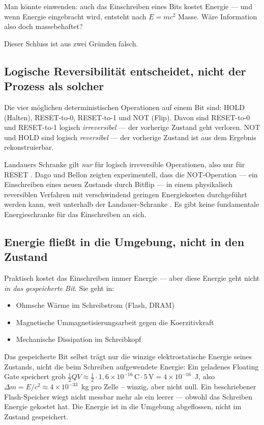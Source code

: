 Man könnte einwenden: auch das Einschreiben eines Bits kostet Energie —
und wenn Energie eingebracht wird, entsteht nach $E = mc^2$ Masse. Wäre
Information also doch massebehaftet?

Dieser Schluss ist aus zwei Gründen falsch.

\subsection{Logische Reversibilität entscheidet, nicht der Prozess als solcher}

Die vier möglichen deterministischen Operationen auf einem Bit sind:
HOLD (Halten), RESET-to-0, RESET-to-1 und NOT (Flip). Davon sind
RESET-to-0 und RESET-to-1 logisch \emph{irreversibel} — der vorherige
Zustand geht verloren. NOT und HOLD sind logisch \emph{reversibel} —
der vorherige Zustand ist aus dem Ergebnis rekonstruierbar.

Landauers Schranke gilt \emph{nur} für logisch irreversible Operationen,
also nur für RESET \cite{Landauer1961}. Dago und Bellon zeigten
experimentell, dass die NOT-Operation — ein Einschreiben eines neuen
Zustands durch Bitflip — in einem physikalisch reversiblen Verfahren
mit verschwindend geringen Energiekosten durchgeführt werden kann, weit
unterhalb der Landauer-Schranke \cite{Dago2023}. Es gibt keine
fundamentale Energieschranke für das Einschreiben an sich.

\subsection{Energie fließt in die Umgebung, nicht in den Zustand}

Praktisch kostet das Einschreiben immer Energie — aber diese Energie
geht nicht \emph{in das gespeicherte Bit}. Sie geht in:

\begin{itemize}
  \item Ohmsche Wärme im Schreibstrom (Flash, DRAM)
  \item Magnetische Ummagnetisierungsarbeit gegen die Koerzitivkraft
  \item Mechanische Dissipation im Schreibkopf
\end{itemize}

Das gespeicherte Bit selbst trägt nur die winzige elektrostatische
Energie seines Zustands, nicht die beim Schreiben aufgewendete Energie:
Ein geladenes Floating Gate speichert grob
$\tfrac12 QV \approx \tfrac12\cdot1{,}6\times10^{-16}\,\text{C}\cdot5\,\text{V} = 4\times10^{-16}$~J,
also $\Delta m = E/c^2 \approx 4\times10^{-33}$~kg pro Zelle -- winzig, aber nicht null.
Ein beschriebener Flash-Speicher wiegt nicht messbar mehr als ein leerer —
obwohl das Schreiben Energie gekostet hat. Die Energie ist in die
Umgebung abgeflossen, nicht im Zustand gespeichert.

